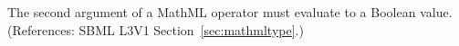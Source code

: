 \removedRule
  {The second argument of a MathML  operator must evaluate to a Boolean value.}
  {(References: SBML L3V1 Section~\ref{sec:mathmltype}.)}
